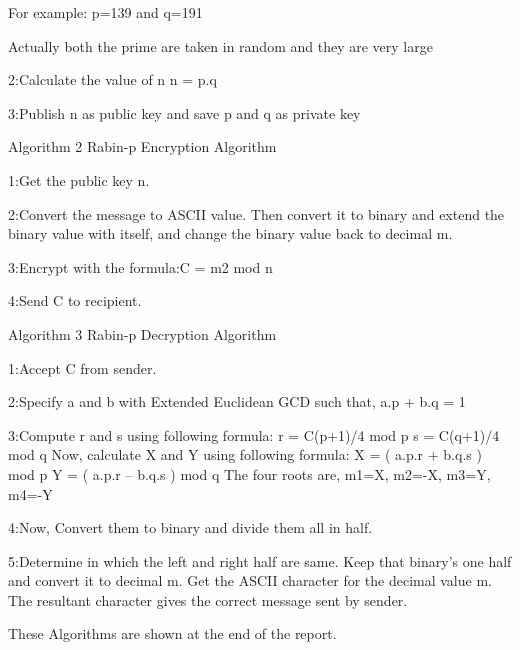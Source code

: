 \documentclass[12pt,a4paper]{article}
\begin{document}
  For example:
  p=139 and q=191
  
  Actually both the prime are taken in random and they are very large
  
  2:Calculate the value of n
   n = p.q
   
3:Publish n as public key and save p and q as private key

Algorithm 2 Rabin-p Encryption Algorithm

1:Get the public key n.

2:Convert the message to ASCII value. Then convert it to binary and
  extend the binary value with itself, and change the binary value back
  to decimal m.
  
3:Encrypt with the formula:C = m2 mod n

4:Send C to recipient.

Algorithm 3 Rabin-p Decryption Algorithm

1:Accept C from sender.

2:Specify a and b with Extended Euclidean GCD such that, a.p + b.q = 1

3:Compute r and s using following formula:
  r = C(p+1)/4 mod p
  s = C(q+1)/4 mod q
  Now, calculate X and Y using following formula:
  X = ( a.p.r + b.q.s ) mod p
  Y = ( a.p.r – b.q.s ) mod q
  The four roots are, m1=X, m2=-X, m3=Y, m4=-Y
  
4:Now, Convert them to binary and divide them all in half.

5:Determine in which the left and right half are same. Keep that
  binary’s one half and convert it to decimal m. Get the ASCII
  character for the decimal value m. The resultant character gives the
  correct message sent by sender.
  
  These Algorithms are shown at the end of the report.
\end{document}
